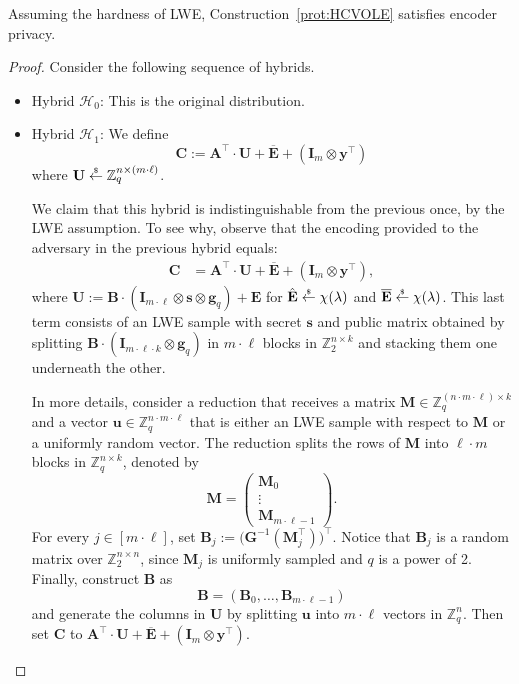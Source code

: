 \documentclass{theoretics}
\newcommand{\getsr}{\overset{\raisebox{-1pt}{$\scriptscriptstyle \$$}}{\gets}}
\newcommand{\sample}{\getsr}
\newcommand{\Z}{\mathbb{Z}}
\renewcommand{\sec}{\ensuremath{\lambda}}
\newcommand{\id}{\ensuremath{\mathbf{I}}}
\begin{document}
\begin{theorem}
    Assuming the hardness of LWE, Construction~\ref{prot:HCVOLE} satisfies encoder privacy.
\end{theorem}
\begin{proof}
    Consider the following sequence of hybrids.
    \begin{itemize}
        \item Hybrid $\mathcal{H}_0$: This is the original distribution.
        \item Hybrid $\mathcal{H}_1$: We define 
        \[
        \mathbf{C} := \mathbf{A}^\intercal \cdot \mathbf{U}+\overline{\mathbf{E}}+(\id_{m}\otimes \mathbf{y}^\intercal)
        \]
        where $\mathbf{U}\sample\Z_q^{n\times (m\cdot \ell)}$.

        We claim that this hybrid is indistinguishable from the previous once, by the LWE assumption. To see why, observe that the encoding provided to the adversary in the previous hybrid equals:
    \begin{align*}\mathbf{C}&=\mathbf{A}^\intercal \cdot \mathbf{U}+\overline{\mathbf{E}}+(\id_{m}\otimes \mathbf{y}^\intercal),
\end{align*}
where $\mathbf{U}:=\mathbf{B}\cdot (\id_{m\cdot \ell}\otimes \mathbf{s}\otimes\mathbf{g}_q)+ \hat{\mathbf{E}}$ for $\hat{\mathbf{E}}\sample{\chi}(\sec)$ and $\overline{\mathbf{E}}\sample\chi(\sec)$. This last term consists of an LWE sample with secret $\mathbf{s}$ and public matrix obtained by splitting $\mathbf{B}\cdot(\id_{m\cdot \ell\cdot k}\otimes \mathbf{g}_q)$ in $m\cdot \ell$ blocks in $\Z_2^{n\times k}$ and stacking them one underneath the other. 

    In more details, consider a reduction that receives a matrix $\mathbf{M}\in\Z_q^{( n\cdot m\cdot \ell)\times k}$ and a vector $\mathbf{u}\in\Z_q^{n\cdot m\cdot \ell}$ that is either an LWE sample with respect to $\mathbf{M}$ or a uniformly random vector. The reduction splits the rows of $\mathbf{M}$ into $\ell\cdot m$ blocks in $\Z_q^{n\times k}$, denoted by
    \[
    \mathbf{M} = \begin{pmatrix}   
    \mathbf{M}_0\\
    \vdots\\
    \mathbf{M}_{m\cdot \ell-1}
    \end{pmatrix}.
    \]
    For every $j\in[m\cdot \ell]$, set $\mathbf{B}_j:= \bigl(\mathbf{G}^{-1}(\mathbf{M}_j^\intercal)\bigr)^\intercal$. Notice that $\mathbf{B}_j$ is a random matrix over $\Z_2^{n\times n}$, since $\mathbf{M}_j$ is uniformly sampled and $q$ is a power of 2. Finally, construct $\mathbf{B}$ as 
    \[
    \mathbf{B} = (\mathbf{B}_0, \dots, \mathbf{B}_{m\cdot\ell -1})
    \]
    and generate the columns in $\mathbf{U}$ by splitting $\mathbf{u}$ into $m\cdot \ell$ vectors in $\Z_q^n$. Then set $\mathbf{C}$ to $\mathbf{A}^\intercal \cdot \mathbf{U}+\overline{\mathbf{E}}+(\id_{m}\otimes \mathbf{y}^\intercal)$.



\end{itemize}
\end{proof}
\end{document}
